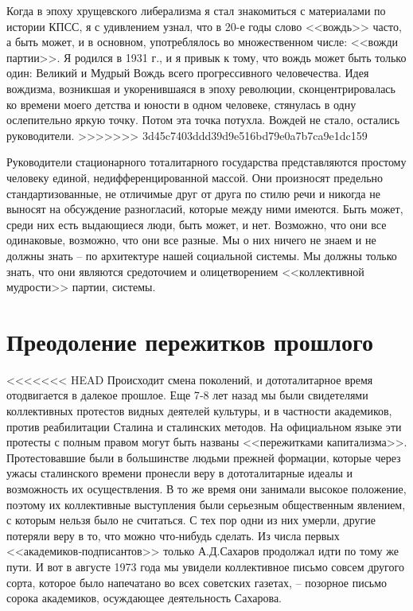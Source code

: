 \documentclass{book}
\begin{document}
Когда в эпоху хрущевского либерализма я стал знакомиться с материалами по истории КПСС, я с удивлением узнал, что в 20-е годы слово <<вождь>> часто, а быть может, и в основном, употреблялось во множественном числе: <<вожди партии>>. Я родился в 1931 г., и я привык к тому, что вождь может быть только один: Великий и Мудрый Вождь всего прогрессивного человечества. Идея вождизма, возникшая и укоренившаяся в эпоху революции, сконцентрировалась ко времени моего детства и юности в одном человеке, стянулась в одну ослепительно яркую точку. Потом эта точка потухла. Вождей не стало, остались руководители.
>>>>>>> 3d45c7403ddd39d9e516bd79e0a7b7ca9e1dc159

Руководители стационарного тоталитарного государства представляются простому человеку единой, недифференцированной массой. Они произносят предельно стандартизованные, не отличимые друг от друга по стилю речи и никогда не выносят на обсуждение разногласий, которые между ними имеются. Быть может, среди них есть выдающиеся люди, быть может, и нет. Возможно, что они все одинаковые, возможно, что они все разные. Мы о них ничего не знаем и не должны знать -- по архитектуре нашей социальной системы. Мы должны только знать, что они являются средоточием и олицетворением <<коллективной мудрости>> партии, системы.



\section{Преодоление пережитков прошлого}

<<<<<<< HEAD
Происходит смена поколений, и дототалитарное время отодвигается в далекое прошлое. Еще 7‑8 лет назад мы были свидетелями коллективных протестов видных деятелей культуры, и в частности академиков, против реабилитации Сталина и сталинских методов. На официальном языке эти протесты с полным правом могут быть названы <<пережитками капитализма>>. Протестовавшие были в большинстве людьми прежней формации, которые через ужасы сталинского времени пронесли веру в дототалитарные идеалы и возможность их осуществления. В то же время они занимали высокое положение, поэтому их коллективные выступления были серьезным общественным явлением, с которым нельзя было не считаться. С тех пор одни из них умерли, другие потеряли веру в то, что можно что‑нибудь сделать. Из числа первых <<академиков‑подписантов>> только А.Д.Сахаров продолжал идти по тому же пути. И вот в августе 1973 года мы увидели коллективное письмо совсем другого сорта, которое было напечатано во всех советских газетах, -- позорное письмо сорока академиков, осуждающее деятельность Сахарова.
\end{document}
